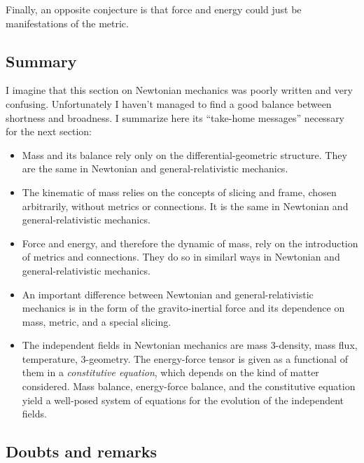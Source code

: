 \documentclass[\ifafour a4paper,12pt,\else a5paper,10pt,\fi%
onecolumn,oneside,article,%
british%
]{memoir}
\theoremstyle{remark}
\theoremstyle{innote}
\newcommand*{\citep}{\footcites}
\renewcommand*{\|}[1][]{\nonscript\,#1\vert\nonscript\;\mathopen{}}
\begin{document}
Finally, an opposite conjecture is that force and energy could just be
manifestations of the metric.

\subsection{Summary}
\label{sec:summary_newtonian}

I imagine that this section on Newtonian mechanics was poorly written and
very confusing. Unfortunately I haven't managed to find a good balance
between shortness and broadness. I summarize here its \enquote{take-home
  messages} necessary for the next section:
\begin{itemize}
\item Mass and its balance rely only on the differential-geometric
  structure. They are the same in Newtonian and general-relativistic
  mechanics.
\item The kinematic of mass relies on the concepts of slicing and frame,
  chosen arbitrarily, without metrics or connections. It is the same in
  Newtonian and general-relativistic mechanics.
\item Force and energy, and therefore the dynamic of mass, rely on the
  introduction of metrics and connections. They do so in similarl ways in
  Newtonian and general-relativistic mechanics.
\item An important difference between Newtonian and general-relativistic
  mechanics is in the form of the gravito-inertial force and its dependence
  on mass, metric, and a special slicing.
\item The independent fields in Newtonian mechanics are mass 3-density,
  mass flux, temperature, 3-geometry. The energy-force tensor is given as a
  functional of them in a \emph{constitutive equation}, which depends on
  the kind of matter considered. Mass balance, energy-force balance, and
  the constitutive equation yield a well-posed system of equations for the
  evolution of the independent fields.
\end{itemize}







\subsection{Doubts and remarks}
\label{sec:doubts_remarks}
\end{document}
